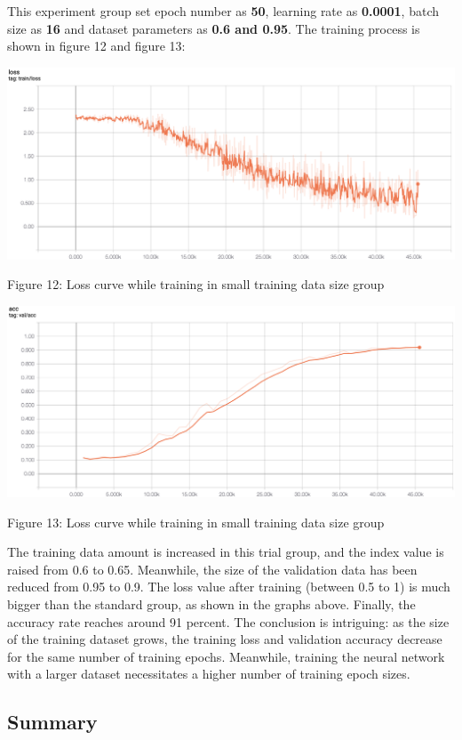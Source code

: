 \documentclass[11pt]{article}
\begin{document}
This experiment group set epoch number as \textbf{50}, learning rate as
\textbf{0.0001}, batch size as \textbf{16} and dataset parameters as
\textbf{0.6 and 0.95}. The training process is shown in figure 12 and
figure 13:

    \includegraphics{../pics/TS_loss.png}

Figure 12: Loss curve while training in small training data size group

\includegraphics{../pics/TS_ACC.png}

Figure 13: Loss curve while training in small training data size group

    The training data amount is increased in this trial group, and the index
value is raised from 0.6 to 0.65. Meanwhile, the size of the validation
data has been reduced from 0.95 to 0.9. The loss value after training
(between 0.5 to 1) is much bigger than the standard group, as shown in
the graphs above. Finally, the accuracy rate reaches around 91 percent.
The conclusion is intriguing: as the size of the training dataset grows,
the training loss and validation accuracy decrease for the same number
of training epochs. Meanwhile, training the neural network with a larger
dataset necessitates a higher number of training epoch sizes.

    \hypertarget{summary}{%
\subsection{Summary}\label{summary}}
\end{document}
